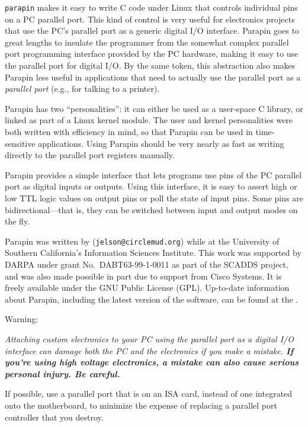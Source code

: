\documentclass{article}
\begin{document}
{\tt parapin} makes it easy to write C code under Linux that controls
individual pins on a PC parallel port.  This kind of control is very
useful for electronics projects that use the PC's parallel port as a
generic digital I/O interface.  Parapin goes to great lengths to
insulate the programmer from the somewhat complex parallel port
programming interface provided by the PC hardware, making it easy to
use the parallel port for digital I/O.  By the same token, this
abstraction also makes Parapin less useful in applications that need
to actually use the parallel port as a {\em parallel port} (e.g., for
talking to a printer).

Parapin has two ``personalities'': it can either be used as a
user-space C library, or linked as part of a Linux kernel module.  The
user and kernel personalities were both written with efficiency in
mind, so that Parapin can be used in time-sensitive applications.
Using Parapin should be very nearly as fast as writing directly to the
parallel port registers manually.

Parapin provides a simple interface that lets programs use pins of the
PC parallel port as digital inputs or outputs.  Using this interface,
it is easy to assert high or low TTL logic values on output pins or
poll the state of input pins.  Some pins are bidirectional---that is,
they can be switched between input and output modes on the fly.

Parapin was written by  ({\tt jelson@circlemud.org}) while
at the University of Southern California's Information Sciences
Institute.  This work was supported by DARPA under grant No.\
DABT63-99-1-0011 as part of the SCADDS project, and was also made
possible in part due to support from Cisco Systems.  It is freely
available under the GNU Public License (GPL).  Up-to-date information
about Parapin, including the latest version of the software, can be
found at the .


{\Huge Warning:}

{\em Attaching custom electronics to your PC using the parallel port
as a digital I/O interface can damage both the PC and the electronics
if you make a mistake. {\bf If you're using high voltage electronics,
a mistake can also cause serious personal injury.  Be careful.}}

If possible, use a parallel port that is on an ISA card, instead of
one integrated onto the motherboard, to minimize the expense of
replacing a parallel port controller that you destroy.
\end{document}
